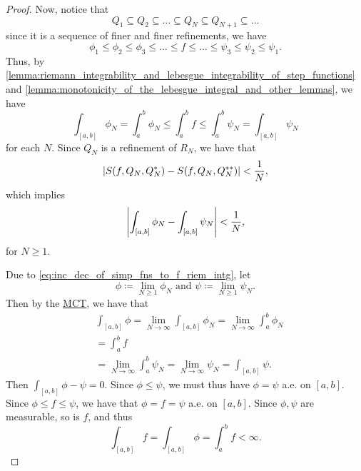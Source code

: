 \documentclass[notoc,notitlepage]{tufte-book}
\begin{document}
\begin{proof}
  Now, notice that
  \begin{equation*}
    Q_1 \subseteq Q_2 \subseteq \hdots \subseteq Q_N \subseteq Q_{N+1} \subseteq
    \hdots
  \end{equation*}
  since it is a sequence of finer and finer refinements, we have
  \begin{equation}\label{eq:inc_dec_of_simp_fns_to_f_riem_intg}
    \phi_1 \leq \phi_2 \leq \phi_3 \leq \hdots \leq f \leq \hdots \leq \psi_3
    \leq \psi_2 \leq \psi_1.
  \end{equation}
  Thus, by
  \cref{lemma:riemann_integrability_and_lebesgue_integrability_of_step_functions}
  and \cref{lemma:monotonicity_of_the_lebesgue_integral_and_other_lemmas}, we have
  \begin{equation*}
    \int_{[a, b]} \phi_N = \int_{a}^{b} \phi_N \leq \int_{a}^{b} f \leq
    \int_{a}^{b} \psi_N = \int_{[a, b]} \psi_N
  \end{equation*}
  for each $N$. Since $Q_N$ is a refinement of $R_N$, we have that
  \begin{equation*}
    \left|S(f, Q_N, Q_N^*) - S(f, Q_N, Q_N^{**})\right| < \frac{1}{N},
  \end{equation*}
  which implies
  \begin{equation*}
    \left|\int_{[a, b]} \phi_N - \int_{[a, b]} \psi_N\right| < \frac{1}{N},
  \end{equation*}
  for $N \geq 1$.

  Due to \cref{eq:inc_dec_of_simp_fns_to_f_riem_intg}, let
  \begin{equation*}
    \phi \coloneqq \lim_{N \geq 1} \phi_N \text{ and } \psi \coloneqq \lim_{N
    \geq 1} \psi_N.
  \end{equation*}
  Then by the \hyperref[thm:the_monotone_convergence_theorem]{MCT}, we have that
  \begin{align*}
    &\int_{[a, b]} \phi = \lim_{N \to \infty} \int_{[a, b]} \phi_N = \lim_{N \to
    \infty} \int_{a}^{b} \phi_N \\
    &= \int_{a}^{b} f \\
    &= \lim_{N \to \infty} \int_{a}^{b} \psi_N = \lim_{N \to \infty} \psi_N =
    \int_{[a, b]} \psi.
  \end{align*}
  Then $\int_{[a, b]} \phi - \psi = 0$. Since $\phi \leq \psi$, we must thus
  have $\phi = \psi$ a.e. on $[a, b]$. Since $\phi \leq f \leq \psi$, we have
  that $\phi = f = \psi$ a.e. on $[a, b]$. Since $\phi, \psi$ are measurable, so
  is $f$, and thus
  \begin{equation*}
    \int_{[a, b]} f = \int_{[a, b]} \phi = \int_{a}^{b} f < \infty.
  \end{equation*}
\end{proof}
\end{document}
